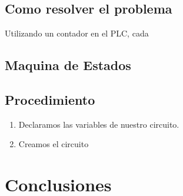 \documentclass[12pt]{report}
\begin{document}
  \section{Como resolver el problema}
  Utilizando un contador en el PLC, cada 
  \section{Maquina de Estados}


\section{Procedimiento}
\begin{enumerate}
  \item Declaramos las variables de nuestro circuito.
  \item Creamos el circuito

\end{enumerate}

\newpage

\chapter{Conclusiones}
\newpage
\end{document}
